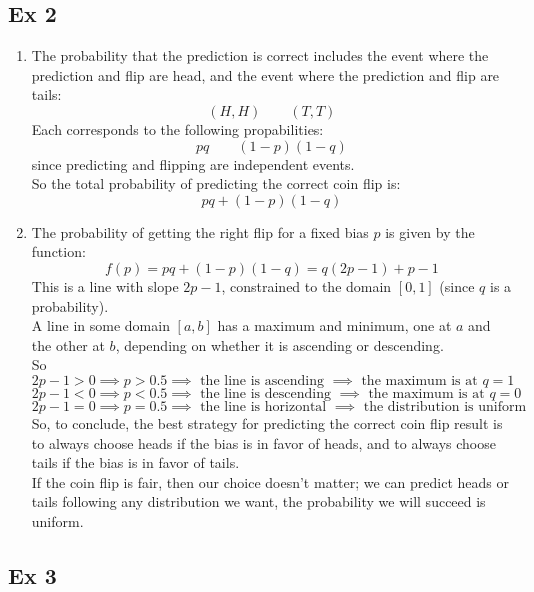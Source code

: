 \documentclass[12pt]{article}
\begin{document}
\newpage

\subsection*{Ex 2}

\begin{enumerate}[label=\alph*)]
    \item 
    The probability that the prediction is correct
    includes the event where the prediction
    and flip are head, and the event where
    the prediction and flip are tails:
    \[(H, H) \qquad  (T, T) \]
    Each corresponds to the following propabilities:
    \[ pq \qquad (1-p)(1-q) \]
    since predicting and flipping are independent
    events. \\
    So the total probability of predicting
    the correct coin flip is:
    \[  pq + (1-p)(1-q) \]
    \item 
    The probability of getting the right flip
    for a fixed bias $p$ is given by the function:
    \[ f(p) = pq + (1-p)(1-q) = q(2p-1) + p - 1 \]
    This is a line with slope $2p-1$,
    constrained to the domain $[0, 1]$
    (since $q$ is a probability). \\
    A line in some domain $[a, b]$
    has a maximum and minimum, one at
    $a$ and the other at $b$, depending on
    whether it is ascending or descending. \\
    So
    \[ 2p-1 > 0 \implies p > 0.5 \implies
    \text{ the line is ascending } \implies
    \text{ the maximum is at } q = 1 \]
    \[ 2p-1 < 0 \implies p < 0.5 \implies
    \text{ the line is descending } \implies
    \text{ the maximum is at } q = 0 \]
    \[ 2p-1 = 0 \implies p = 0.5 \implies
    \text{ the line is horizontal } \implies
    \text{ the distribution is uniform } \]
    So, to conclude, the best strategy for predicting
    the correct coin flip result is to
    always choose heads if the bias is
    in favor of heads, and to always choose tails
    if the bias is in favor of tails. \\
    If the coin flip is fair,
    then our choice doesn't matter;
    we can predict heads or tails
    following any distribution we want,
    the probability we will succeed is uniform. \\
\end{enumerate}

\newpage

\subsection*{Ex 3}
\end{document}
